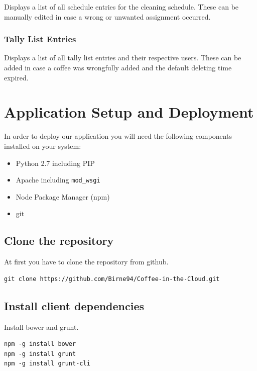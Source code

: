 Displays a list of all schedule entries for the cleaning schedule. These
can be manually edited in case a wrong or unwanted assignment occurred.

\subsubsection{Tally List Entries}\label{tally-list-entries}

Displays a list of all tally list entries and their respective users.
These can be added in case a coffee was wrongfully added and the default
deleting time expired.

\newpage
\section{Application Setup and
Deployment}\label{application-setup-and-deployment}

In order to deploy our application you will need the following
components installed on your system:

\begin{itemize}
\item
  Python 2.7 including PIP
\item
  Apache including \texttt{mod\_wsgi}
\item
  Node Package Manager (npm)
\item
  git
\end{itemize}

\subsection{Clone the repository}\label{clone-the-repository}

At first you have to clone the repository from github.

\begin{verbatim}
git clone https://github.com/Birne94/Coffee-in-the-Cloud.git
\end{verbatim}

\subsection{Install client
dependencies}\label{install-client-dependencies}

Install bower and grunt.

\begin{verbatim}
npm -g install bower
npm -g install grunt
npm -g install grunt-cli
\end{verbatim}

